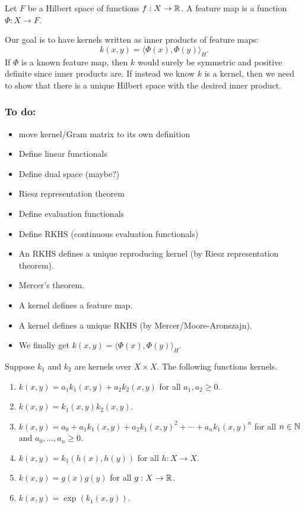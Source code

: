 \begin{definition}
    \cite{rudin2020notes}
    Let \(F\) be a Hilbert space of functions \(f : X \to \mathbb{R}\).
    A feature map is a function \(\Phi : X \to F\).
\end{definition}

Our goal is to have kernels written as inner products of feature maps:
\[k(x,y) = \langle \Phi(x), \Phi(y) \rangle_H.\]
If \(\Phi\) is a known feature map, then \(k\) would surely be symmetric and positive definite since inner products are.
If instead we know \(k\) is a kernel, then we need to show that there is a unique Hilbert space with the desired inner product.

\subsubsection*{To do:}
\begin{itemize}
    \item move kernel/Gram matrix to its own definition
    \item Define linear functionals
    \item Define dual space (maybe?)
    \item Riesz representation theorem
    \item Define evaluation functionals
    \item Define RKHS (continuous evaluation functionals)
    \item An RKHS defines a unique reproducing kernel (by Riesz representation theorem).
    \item Mercer's theorem.
    \item A kernel defines a feature map.
    \item A kernel defines a unique RKHS (by Mercer/Moore-Aronszajn).
    \item We finally get \(k(x,y) = \langle \Phi(x), \Phi(y) \rangle_H\).
\end{itemize}

\begin{theorem}
    \cite{rudin2020notes,shawe2004kernel}
    Suppose \(k_1\) and \(k_2\) are kernels over \(X \times X\).
    The following functions kernels.
    \begin{enumerate}
        \item \(k(x,y) = a_1 k_1(x,y) + a_2 k_2(x,y)\) for all \(a_1, a_2 \geq 0\).
        \item \(k(x,y) = k_1(x,y) k_2(x,y)\).
        \item \(k(x,y) = a_0 + a_1 k_1(x,y) + a_2 k_1(x,y)^2 + \cdots + a_n k_1(x,y)^n\) for all \(n \in \mathbb{N}\) and \(a_0, \dots, a_n \geq 0\).
        \item \(k(x,y) = k_1(h(x),h(y))\) for all \(h : X \to X\).
        \item \(k(x,y) = g(x)g(y)\) for all \(g : X \to \mathbb{R}\).
        \item \(k(x,y) = \exp(k_1(x,y))\).
    \end{enumerate}
\end{theorem}

